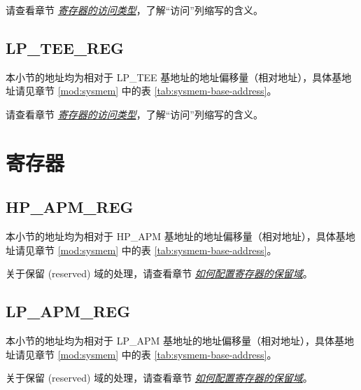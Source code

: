 \documentclass[main\_\_CN.tex]{subfiles}
\begin{document}
请查看章节 \hyperref[glossary-access-types]{\textit{寄存器的访问类型}}，了解“访问”列缩写的含义。




\subsection{LP\_TEE\_REG}
\label{sec:permctrl-reg-lp-tee}

本小节的地址均为相对于 LP\_TEE 基地址的地址偏移量（相对地址），具体基地址请见章节 \ref{mod:sysmem} \textit{} 中的表 \ref{tab:sysmem-base-address}。

请查看章节 \hyperref[glossary-access-types]{\textit{寄存器的访问类型}}，了解“访问”列缩写的含义。





\newpage
\section{寄存器}

\subsection{HP\_APM\_REG}

本小节的地址均为相对于 HP\_APM 基地址的地址偏移量（相对地址），具体基地址请见章节 \ref{mod:sysmem} \textit{} 中的表 \ref{tab:sysmem-base-address}。

关于保留 (reserved) 域的处理，请查看章节 \hyperref[programming-reserved-field]{\textit{如何配置寄存器的保留域}}。



\subsection{LP\_APM\_REG}

本小节的地址均为相对于 LP\_APM 基地址的地址偏移量（相对地址），具体基地址请见章节 \ref{mod:sysmem} \textit{} 中的表 \ref{tab:sysmem-base-address}。

关于保留 (reserved) 域的处理，请查看章节 \hyperref[programming-reserved-field]{\textit{如何配置寄存器的保留域}}。
\end{document}
